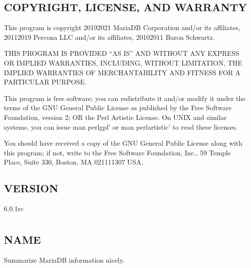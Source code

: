 \documentclass[letterpaper,10pt,english]{sphinxmanual}
\begin{document}
\section{COPYRIGHT, LICENSE, AND WARRANTY}
\label{\detokenize{mariadb-config-diff:copyright-license-and-warranty}}
\sphinxAtStartPar
This program is copyright 2019\sphinxhyphen{}2021 MariaDB Corporation and/or its affiliates,
2011\sphinxhyphen{}2019 Percona LLC and/or its affiliates, 2010\sphinxhyphen{}2011 Baron Schwartz.

\sphinxAtStartPar
THIS PROGRAM IS PROVIDED “AS IS” AND WITHOUT ANY EXPRESS OR IMPLIED
WARRANTIES, INCLUDING, WITHOUT LIMITATION, THE IMPLIED WARRANTIES OF
MERCHANTABILITY AND FITNESS FOR A PARTICULAR PURPOSE.

\sphinxAtStartPar
This program is free software; you can redistribute it and/or modify it under
the terms of the GNU General Public License as published by the Free Software
Foundation, version 2; OR the Perl Artistic License.  On UNIX and similar
systems, you can issue \textasciigrave{}man perlgpl’ or \textasciigrave{}man perlartistic’ to read these
licenses.

\sphinxAtStartPar
You should have received a copy of the GNU General Public License along with
this program; if not, write to the Free Software Foundation, Inc., 59 Temple
Place, Suite 330, Boston, MA  02111\sphinxhyphen{}1307  USA.


\section{VERSION}
\label{\detokenize{mariadb-config-diff:version}}
\sphinxAtStartPar
{} 6.0.1rc


\chapter{}
\label{\detokenize{mariadb-database-summary:mariadb-database-summary}}\label{\detokenize{mariadb-database-summary::doc}}

\section{NAME}
\label{\detokenize{mariadb-database-summary:name}}
\sphinxAtStartPar
{} \sphinxhyphen{} Summarize MariaDB information nicely.
\end{document}
